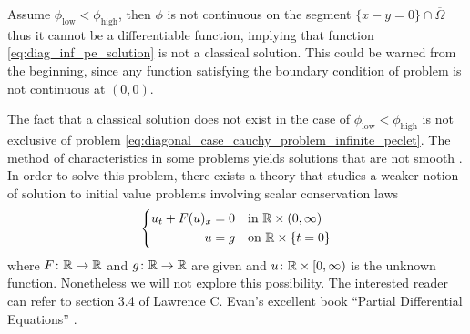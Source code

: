 Assume $\phi_\text{low} < \phi_\text{high}$, then $\phi$ is not continuous on
the segment $\{ x - y = 0 \} \cap \overline{\Omega}$ thus it cannot be a
differentiable function, implying that function \eqref{eq:diag_inf_pe_solution}
is not a classical solution. This could be warned from the beginning, since any
function satisfying the boundary condition of problem
 is not continuous at
$(0,0)$.

The fact that a classical solution does not exist in the case of
$\phi_\text{low} < \phi_\text{high}$ is not exclusive of problem
\eqref{eq:diagonal_case_cauchy_problem_infinite_peclet}. The method of
characteristics in some problems yields solutions that are not smooth
\cite{evans1998pde}. In order to solve this problem, there exists a theory that
studies a weaker notion of solution to initial value problems involving scalar
conservation laws
\begin{equation*}
	\left\{
		\begin{aligned}
			u_t + F(u)_x &= 0 & &\text{in } \mathbb{R} \times (0,\infty) \\
			u &= g & &\text{on } \mathbb{R} \times \{ t = 0 \}
		\end{aligned}
	\right.
\end{equation*}
where $F \colon \mathbb{R} \to \mathbb{R}$ and $g \colon \mathbb{R} \to \mathbb{R}$ are given and $u
\colon \mathbb{R} \times [0,\infty)$ is the unknown function. Nonetheless we will not
explore this possibility. The interested reader can refer to section 3.4 of
Lawrence C. Evan's excellent book ``Partial Differential Equations'' \cite{evans1998pde}.



